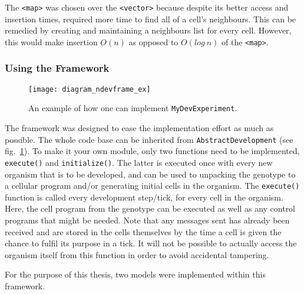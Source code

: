 The \texttt{<map>} was chosen over the \texttt{<vector>} because despite its better access and insertion times, required more time to find all of a cell's neighbours. This can be remedied by creating and maintaining a neighbours list for every cell. However, this would make insertion $O(n)$ as opposed to $O(log~n)$ of the \texttt{<map>}.

\subsubsection{Using the Framework}
\begin{figure}[!ht]
	\centering
	\texttt{[image: diagram\_ndevframe\_ex]}
	\caption{An example of how one can implement \texttt{MyDevExperiment}.}
	\label{fig:diagram_ndevframe_ex}
\end{figure}

The framework was designed to ease the implementation effort as much as possible. The whole code base can be inherited from \texttt{AbstractDevelopment} (see fig.~\ref{fig:diagram_ndevframe_ex}). To make it your own module, only two functions need to be implemented, \texttt{execute()} and \texttt{initialize()}. The latter is executed once with every new organism that is to be developed, and can be used to unpacking the genotype to a cellular program and/or generating initial cells in the organism. The \texttt{execute()} function is called every development step/tick, for every cell in the organism. Here, the cell program from the genotype can be executed as well as any control programs that might be needed. Note that any messages sent has already been received and are stored in the cells themselves by the time a cell is given the chance to fulfil its purpose in a tick. It will not be possible to actually access the organism itself from this function in order to avoid accidental tampering.

For the purpose of this thesis, two models were implemented within this framework.

